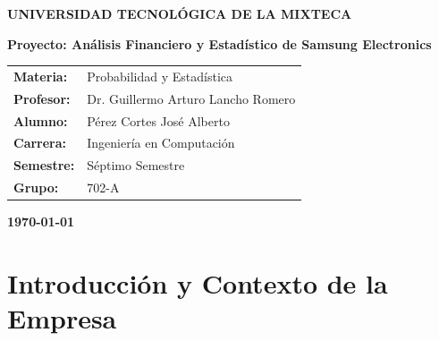 \documentclass[12pt, a4paper]{article}
\begin{document}
\pagestyle{empty}


\begin{center}
    \vspace*{3cm} %
    \Large\textbf{UNIVERSIDAD TECNOLÓGICA DE LA MIXTECA}
    
    \vspace{0.5cm}
    
    \vspace{1.5cm}
    \begin{Huge}\textbf{Proyecto: Análisis Financiero y Estadístico de Samsung Electronics}\end{Huge}
    
    \vspace{2.5cm}
    \begin{tabular}{l l}
    \textbf{Materia:} & Probabilidad y Estadística \\[0.8cm]
    \textbf{Profesor:} & Dr. Guillermo Arturo Lancho Romero \\[0.8cm]
    \textbf{Alumno:} & Pérez Cortes José Alberto \\[0.8cm]
    \textbf{Carrera:} & Ingeniería en Computación \\[0.8cm]
    \textbf{Semestre:} & Séptimo Semestre \\[0.8cm]
    \textbf{Grupo:} & 702-A \\
    \end{tabular}
    
    \vspace{3cm}
    \large\textbf{\today}
\end{center}

\newpage
{}
\setcounter{page}{1}

\section*{Introducción y Contexto de la Empresa}
\end{document}

